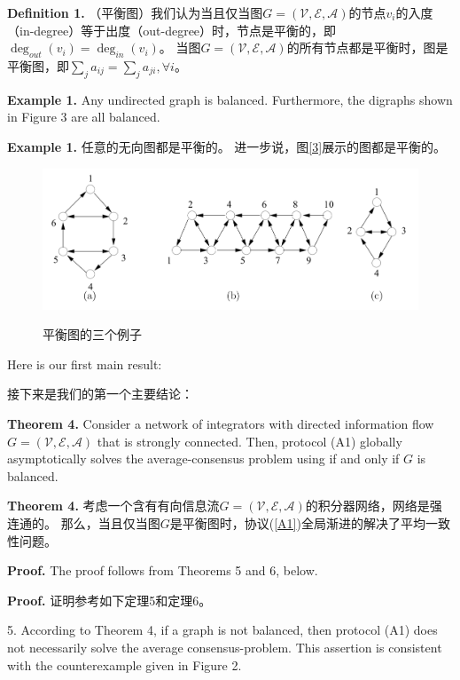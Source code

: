 \documentclass{article}
\begin{document}
\noindent \textbf{Definition 1.} （平衡图）我们认为当且仅当图$G=(\mathcal{V}, \mathcal{E}, \mathcal{A})$的节点$v_i$的入度（in-degree）等于出度（out-degree）时，节点是平衡的，即$\deg_{out}(v_i)=\deg_{in}(v_i)$。
当图$G=(\mathcal{V}, \mathcal{E}, \mathcal{A})$的所有节点都是平衡时，图是平衡图，即$\sum_{j}a_{ij} = \sum_{j}a_{ji}, \forall i$。

{\color[gray]{0.5}
\noindent \textbf{Example 1.} Any undirected graph is balanced. Furthermore, the digraphs shown in Figure 3 are all balanced.
}

\noindent \textbf{Example 1.} 任意的无向图都是平衡的。
进一步说，图\ref{3}展示的图都是平衡的。

\begin{figure}[htbp]
    \centering
    \includegraphics[width=12cm]{figures/Fig3-BalancedGraphs.jpeg}
    \label{BalancedGraphs}
    \caption{平衡图的三个例子}
\end{figure}

{\color[gray]{0.5}
\noindent Here is our ﬁrst main result:
}

\noindent 接下来是我们的第一个主要结论：

{\color[gray]{0.5}
\noindent \textbf{Theorem 4.} Consider a network of integrators with directed information ﬂow $G=(\mathcal{V}, \mathcal{E}, \mathcal{A})$ that is strongly connected. 
Then, protocol (A1) globally asymptotically solves the average-consensus problem using if and only if $G$ is balanced.
}

\noindent \textbf{Theorem 4.} 考虑一个含有有向信息流$G=(\mathcal{V}, \mathcal{E}, \mathcal{A})$的积分器网络，网络是强连通的。
那么，当且仅当图$G$是平衡图时，协议(\ref{A1})全局渐进的解决了平均一致性问题。

{\color[gray]{0.5}
\noindent \textbf{Proof.} The proof follows from Theorems 5 and 6, below.
}

\noindent \textbf{Proof.} 证明参考如下定理5和定理6。

{\color[gray]{0.5}
 5. According to Theorem 4, if a graph is not balanced, then protocol (A1) does not necessarily solve the average consensus-problem. This assertion is consistent with the counterexample given in Figure 2.
}
\end{document}
